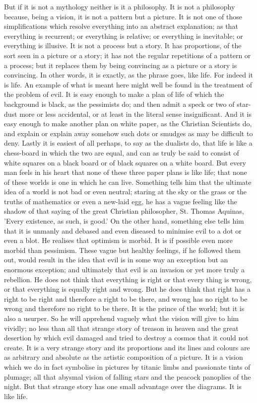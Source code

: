 But if it is not a mythology neither is it a philosophy. It is not a philosophy because, being a vision, it is not a pattern but a picture. It is not one of those simplifications which resolve everything into an abstract explanation; as that everything is recurrent; or everything is relative; or everything is inevitable; or everything is illusive. It is not a process but a story. It has proportions, of the sort seen in a picture or a story; it has not the regular repetitions of a pattern or a process; but it replaces them by being convincing as a picture or a story is convincing. In other words, it is exactly, as the phrase goes, like life. For indeed it is life. An example of what is meant here might well be found in the treatment of the problem of evil. It is easy enough to make a plan of life of which the background is black, as the pessimists do; and then admit a speck or two of star-dust more or less accidental, or at least in the literal sense insignificant. And it is easy enough to make another plan on white paper, as the Christian Scientists do, and explain or explain away somehow such dots or smudges as may be difficult to deny. Lastly it is easiest of all perhaps, to say as the dualists do, that life is like a chess-board in which the two are equal, and can as truly be said to consist of white squares on a black board or of black squares on a white board. But every man feels in his heart that none of these three paper plans is like life; that none of these worlds is one in which he can live. Something tells him that the ultimate idea of a world is not bad or even neutral; staring at the sky or the grass or the truths of mathematics or even a new-laid egg, he has a vague feeling like the shadow of that saying of the great Christian philosopher, St. Thomas Aquinas, 'Every existence, as such, is good.' On the other hand, something else tells him that it is unmanly and debased and even diseased to minimise evil to a dot or even a blot. He realises that optimism is morbid. It is if possible even more morbid than pessimism. These vague but healthy feelings, if he followed them out, would result in the idea that evil is in some way an exception but an enormous exception; and ultimately that evil is an invasion or yet more truly a rebellion. He does not think that everything is right or that every thing is wrong, or that everything is equally right and wrong. But he does think that right has a right to be right and therefore a right to be there, and wrong has no right to be wrong and therefore no right to be there. It is the prince of the world; but it is also a usurper. So he will apprehend vaguely what the vision will give to him vividly; no less than all that strange story of treason in heaven and the great desertion by which evil damaged and tried to destroy a cosmos that it could not create. It is a very strange story and its proportions and its lines and colours are as arbitrary and absolute as the artistic composition of a picture. It is a vision which we do in fact symbolise in pictures by titanic limbs and passionate tints of plumage; all that abysmal vision of falling stars and the peacock panoplies of the night. But that strange story has one small advantage over the diagrams. It is like life.

